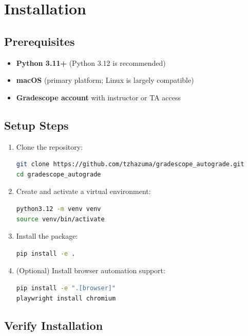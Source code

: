 \documentclass[11pt,a4paper]{article}
\begin{document}
\section{Installation}

\subsection{Prerequisites}

\begin{itemize}[itemsep=2pt]
    \item \textbf{Python 3.11+} (Python 3.12 is recommended)
    \item \textbf{macOS} (primary platform; Linux is largely compatible)
    \item \textbf{Gradescope account} with instructor or TA access
\end{itemize}

\subsection{Setup Steps}

\begin{enumerate}[itemsep=5pt]
    \item Clone the repository:
\begin{lstlisting}[language=bash]
git clone https://github.com/tzhazuma/gradescope_autograde.git
cd gradescope_autograde
\end{lstlisting}

    \item Create and activate a virtual environment:
\begin{lstlisting}[language=bash]
python3.12 -m venv venv
source venv/bin/activate
\end{lstlisting}

    \item Install the package:
\begin{lstlisting}[language=bash]
pip install -e .
\end{lstlisting}

    \item (Optional) Install browser automation support:
\begin{lstlisting}[language=bash]
pip install -e ".[browser]"
playwright install chromium
\end{lstlisting}
\end{enumerate}

\subsection{Verify Installation}
\end{document}
